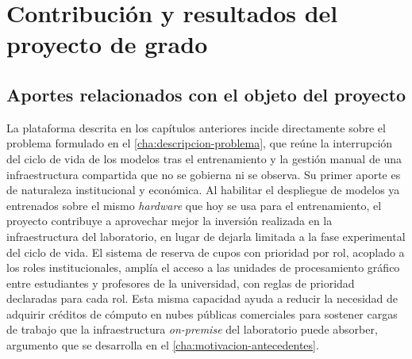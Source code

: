 %
\chapter{Contribución y resultados del proyecto de grado}\label{cha:contribucion-resultados}

\section{Aportes relacionados con el objeto del proyecto}

La plataforma descrita en los capítulos anteriores incide directamente sobre el problema formulado en el \cref{cha:descripcion-problema}, que reúne la interrupción del ciclo de vida de los modelos tras el entrenamiento y la gestión manual de una infraestructura compartida que no se gobierna ni se observa. Su primer aporte es de naturaleza institucional y económica. Al habilitar el despliegue de modelos ya entrenados sobre el mismo \emph{hardware} que hoy se usa para el entrenamiento, el proyecto contribuye a aprovechar mejor la inversión realizada en la infraestructura del laboratorio, en lugar de dejarla limitada a la fase experimental del ciclo de vida. El sistema de reserva de cupos con prioridad por rol, acoplado a los roles institucionales, amplía el acceso a las unidades de procesamiento gráfico entre estudiantes y profesores de la universidad, con reglas de prioridad declaradas para cada rol. Esta misma capacidad ayuda a reducir la necesidad de adquirir créditos de cómputo en nubes públicas comerciales para sostener cargas de trabajo que la infraestructura \emph{on-premise} del laboratorio puede absorber, argumento que se desarrolla en el \cref{cha:motivacion-antecedentes}.

